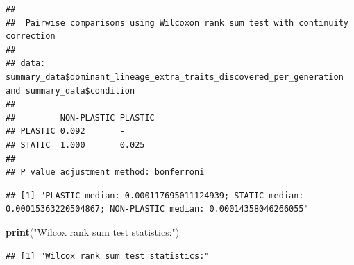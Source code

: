 \documentclass[]{book}
\newenvironment{Shaded}{\begin{snugshade}}{\end{snugshade}}
\newcommand{\DataTypeTok}[1]{\textcolor[rgb]{0.13,0.29,0.53}{#1}}
\newcommand{\KeywordTok}[1]{\textcolor[rgb]{0.13,0.29,0.53}{\textbf{#1}}}
\newcommand{\NormalTok}[1]{#1}
\newcommand{\OperatorTok}[1]{\textcolor[rgb]{0.81,0.36,0.00}{\textbf{#1}}}
\newcommand{\StringTok}[1]{\textcolor[rgb]{0.31,0.60,0.02}{#1}}
\begin{document}
\begin{verbatim}
## 
##  Pairwise comparisons using Wilcoxon rank sum test with continuity correction 
## 
## data:  summary_data$dominant_lineage_extra_traits_discovered_per_generation and summary_data$condition 
## 
##         NON-PLASTIC PLASTIC
## PLASTIC 0.092       -      
## STATIC  1.000       0.025  
## 
## P value adjustment method: bonferroni
\end{verbatim}

\begin{Shaded}
\end{Shaded}

\begin{verbatim}
## [1] "PLASTIC median: 0.000117695011124939; STATIC median: 0.00015363220504867; NON-PLASTIC median: 0.00014358046266055"
\end{verbatim}

\begin{Shaded}
\begin{Highlighting}[]
\KeywordTok{print}\NormalTok{(}\StringTok{"Wilcox rank sum test statistics:"}\NormalTok{)}
\end{Highlighting}
\end{Shaded}

\begin{verbatim}
## [1] "Wilcox rank sum test statistics:"
\end{verbatim}
\end{document}
